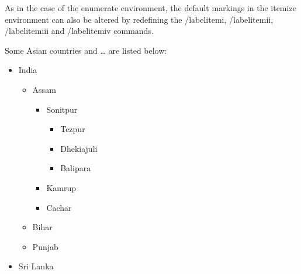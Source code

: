 \documentclass[11pt,a4paper]{article}
\begin{document}
As in the case of the enumerate environment, the default markings in the itemize environment can also be altered by redefining the /labelitemi, /labelitemii, /labelitemiii and /labelitemiv commands.
\vspace{20mm}

Some Asian countries and … are listed below:
\begin{itemize}
    \item India
        \begin{itemize}
            \item Assam
            \begin{itemize}
                \item Sonitpur
                \begin{itemize}
                    \item Tezpur
                    \item Dhekiajuli
                    \item Balipara
                \end{itemize}
                \item Kamrup
                \item Cachar
            \end{itemize}
            \item Bihar
            \item Punjab
        \end{itemize}
    \item Sri Lanka
\end{itemize}
\end{document}
